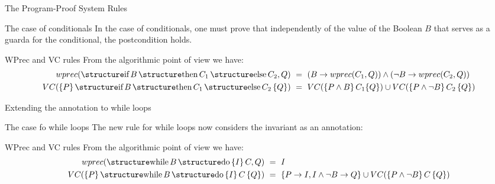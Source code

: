 \documentclass[aspectratio=169]{beamer}
\begin{document}
\begin{frame}[fragile]{The Program-Proof System Rules}
  \begin{block}{The case of conditionals}
  In the case of conditionals, one must prove that independently of the value of the Boolean $B$ that serves as a guarda for the conditional, the postcondition holds. 
    \begin{prooftree}
    \end{prooftree}
  \end{block}
\begin{block}{WPrec and VC rules}
  From the algorithmic point of view we have:
  \begin{align*}
  wprec(\kw{if}\,B\,\kw{then}\,C_1\,\kw{else}\,C_2,Q) & ~=~ (B \to wprec(C_1,Q)) \land (\neg B \to wprec(C_2,Q))\\
  VC(\{P\}\,\kw{if}\,B\,\kw{then}\,C_1\,\kw{else}\,C_2\,\{Q\}) & ~=~ 
VC(\{P \land B\}\,C_1\{Q\}) \cup VC(\{P \land \neg B\}\,C_2\,\{Q\})
 \end{align*}
 \end{block}
\end{frame}

\begin{frame}[fragile]{Extending the annotation to while loops}
  \begin{block}{The case fo while loops}
  The new rule for while loops now considers the invariant as an annotation:
    \begin{prooftree}
    \end{prooftree}
  \end{block}
  \begin{block}{WPrec and VC rules}
  From the algorithmic point of view we have:
  \begin{align*}
  wprec(\kw{while}\,B\,\kw{do}\,\{I\}\,C,Q) & ~=~ I\\
  VC(\{P\}\,\kw{while}\,B\,\kw{do}\,\{I\}\,C\,\{Q\}) & ~=~
 \{ P \to I , I \land \neg B \to Q\} \cup VC(\{P \land \neg B\}\,C\,\{Q\})
 \end{align*}
 \end{block}
\end{frame}
\end{document}

